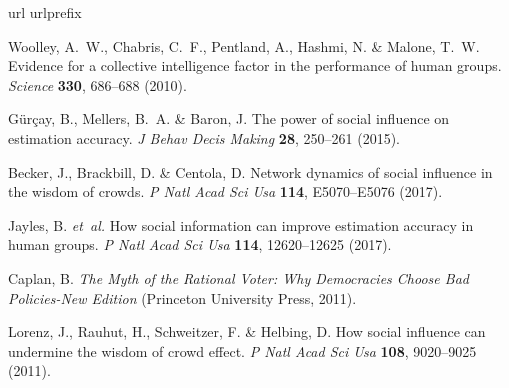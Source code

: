\documentclass[9pt,a4paper,twocolumn,lineno]{article}
\begin{document}
\setlength{\bibsep}{0.0pt}
\begin{thebibliography}{10}\scriptsize
\expandafter\ifx\csname url\endcsname\relax
  \def\url#1{\texttt{#1}}\fi
\expandafter\ifx\csname urlprefix\endcsname\relax\def\urlprefix{URL }\fi
\providecommand{\bibinfo}[2]{#2}
\providecommand{\eprint}[2][]{\url{#2}}

\bibinfo{author}{Woolley, A.~W.}, \bibinfo{author}{Chabris, C.~F.},
  \bibinfo{author}{Pentland, A.}, \bibinfo{author}{Hashmi, N.} \&
  \bibinfo{author}{Malone, T.~W.}
\newblock \bibinfo{title}{Evidence for a collective intelligence factor in the
  performance of human groups}.
\newblock \emph{\bibinfo{journal}{Science}} \textbf{\bibinfo{volume}{330}},
  \bibinfo{pages}{686--688} (\bibinfo{year}{2010}).

\bibinfo{author}{G{\"u}r{\c{c}}ay, B.}, \bibinfo{author}{Mellers, B.~A.} \&
  \bibinfo{author}{Baron, J.}
\newblock \bibinfo{title}{The power of social influence on estimation
  accuracy}.
\newblock \emph{\bibinfo{journal}{J Behav Decis Making}}
  \textbf{\bibinfo{volume}{28}}, \bibinfo{pages}{250--261}
  (\bibinfo{year}{2015}).

\bibinfo{author}{Becker, J.}, \bibinfo{author}{Brackbill, D.} \&
  \bibinfo{author}{Centola, D.}
\newblock \bibinfo{title}{Network dynamics of social influence in the wisdom of
  crowds}.
\newblock \emph{\bibinfo{journal}{P Natl Acad Sci Usa}}
  \textbf{\bibinfo{volume}{114}}, \bibinfo{pages}{E5070--E5076}
  (\bibinfo{year}{2017}).

\bibinfo{author}{Jayles, B.} \emph{et~al.}
\newblock \bibinfo{title}{How social information can improve estimation
  accuracy in human groups}.
\newblock \emph{\bibinfo{journal}{P Natl Acad Sci Usa}}
  \textbf{\bibinfo{volume}{114}}, \bibinfo{pages}{12620--12625}
  (\bibinfo{year}{2017}).

\bibinfo{author}{Caplan, B.}
\newblock \emph{\bibinfo{title}{The Myth of the Rational Voter: Why Democracies
  Choose Bad Policies-New Edition}} (\bibinfo{publisher}{Princeton University
  Press}, \bibinfo{year}{2011}).

\bibinfo{author}{Lorenz, J.}, \bibinfo{author}{Rauhut, H.},
  \bibinfo{author}{Schweitzer, F.} \& \bibinfo{author}{Helbing, D.}
\newblock \bibinfo{title}{How social influence can undermine the wisdom of
  crowd effect}.
\newblock \emph{\bibinfo{journal}{P Natl Acad Sci Usa}}
  \textbf{\bibinfo{volume}{108}}, \bibinfo{pages}{9020--9025}
  (\bibinfo{year}{2011}).


\end{thebibliography}
\end{document}
